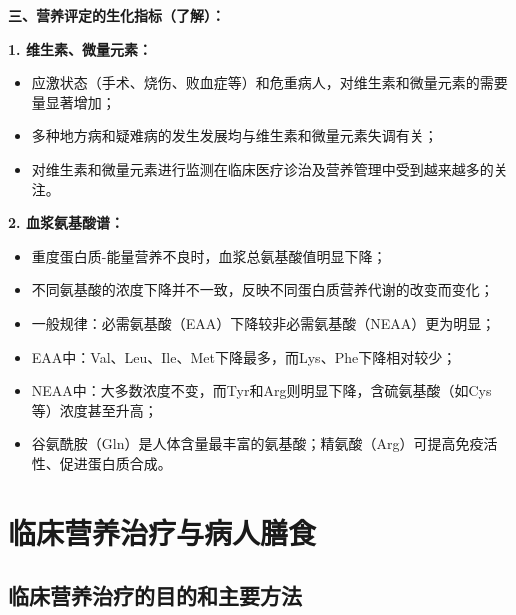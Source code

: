 \begin{tipbox}
\textbf{三、营养评定的生化指标（了解）：}

\textbf{1. 维生素、微量元素：}
\begin{itemize}[leftmargin=*]
    \item 应激状态（手术、烧伤、败血症等）和危重病人，对维生素和微量元素的需要量显著增加；
    \item 多种地方病和疑难病的发生发展均与维生素和微量元素失调有关；
    \item 对维生素和微量元素进行监测在临床医疗诊治及营养管理中受到越来越多的关注。
\end{itemize}

\textbf{2. 血浆氨基酸谱：}
\begin{itemize}[leftmargin=*]
    \item 重度蛋白质-能量营养不良时，血浆总氨基酸值明显下降；
    \item 不同氨基酸的浓度下降并不一致，反映不同蛋白质营养代谢的改变而变化；
    \item 一般规律：必需氨基酸（EAA）下降较非必需氨基酸（NEAA）更为明显；
    \item EAA中：Val、Leu、Ile、Met下降最多，而Lys、Phe下降相对较少；
    \item NEAA中：大多数浓度不变，而Tyr和Arg则明显下降，含硫氨基酸（如Cys等）浓度甚至升高；
    \item 谷氨酰胺（Gln）是人体含量最丰富的氨基酸；精氨酸（Arg）可提高免疫活性、促进蛋白质合成。
\end{itemize}
\end{tipbox}

\section{临床营养治疗与病人膳食}

\subsection{临床营养治疗的目的和主要方法}

